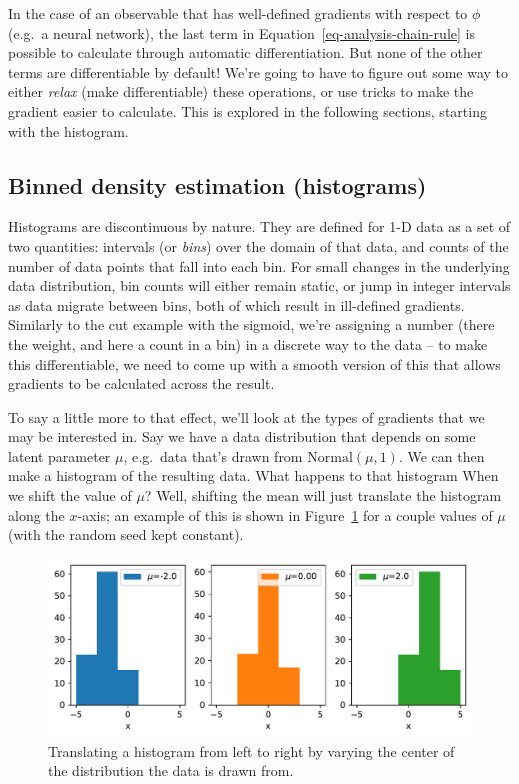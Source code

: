 \documentclass[
  11pt,
  numbers=noendperiod]{book}
\begin{document}
In the case of an observable that has well-defined gradients with
respect to \(\phi\) (e.g.~a neural network), the last term in
Equation~\ref{eq-analysis-chain-rule} is possible to calculate through
automatic differentiation. But none of the other terms are
differentiable by default! We're going to have to figure out some way to
either \emph{relax} (make differentiable) these operations, or use
tricks to make the gradient easier to calculate. This is explored in the
following sections, starting with the histogram.

\hypertarget{sec-bkde}{%
\subsection{Binned density estimation (histograms)}\label{sec-bkde}}

Histograms are discontinuous by nature. They are defined for 1-D data as
a set of two quantities: intervals (or \emph{bins}) over the domain of
that data, and counts of the number of data points that fall into each
bin. For small changes in the underlying data distribution, bin counts
will either remain static, or jump in integer intervals as data migrate
between bins, both of which result in ill-defined gradients. Similarly
to the cut example with the sigmoid, we're assigning a number (there the
weight, and here a count in a bin) in a discrete way to the data -- to
make this differentiable, we need to come up with a smooth version of
this that allows gradients to be calculated across the result.

To say a little more to that effect, we'll look at the types of
gradients that we may be interested in. Say we have a data distribution
that depends on some latent parameter \(\mu\), e.g.~data that's drawn
from \(\mathrm{Normal}(\mu, 1)\). We can then make a histogram of the
resulting data. What happens to that histogram When we shift the value
of \(\mu\)? Well, shifting the mean will just translate the histogram
along the \(x\)-axis; an example of this is shown in
Figure~\ref{fig-hist-mus} for a couple values of \(\mu\) (with the
random seed kept constant).

\begin{figure}

{\centering \includegraphics{./diffprog-hep_files/figure-pdf/fig-hist-mus-output-1.pdf}

}

\caption{\label{fig-hist-mus}Translating a histogram from left to right
by varying the center of the distribution the data is drawn from.}

\end{figure}
\end{document}
